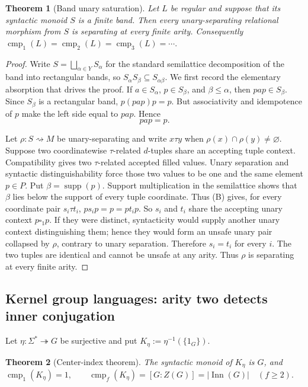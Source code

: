 \documentclass[10pt,a4paper]{article}
\newtheorem{theorem}{Theorem}[section]
\theoremstyle{definition}
\theoremstyle{remark}
\newcommand{\cmp}{\operatorname{cmp}}
\newcommand{\blank}{\square}
\newcommand{\relto}{\mathrel{\rightsquigarrow}}
\begin{document}
\begin{theorem}[Band unary saturation]
\label{band:thm:unary-saturation}
Let \(L\) be regular and suppose that its syntactic monoid \(S\) is a finite
band.  Then every unary-separating relational morphism from \(S\) is
separating at every finite arity.  Consequently
\(\cmp_1(L)=\cmp_2(L)=\cmp_3(L)=\cdots.\)
\end{theorem}

\begin{proof}
Write
\(S=\bigsqcup_{\alpha\in Y}S_\alpha\)
for the standard semilattice decomposition of the band into rectangular
bands, so
\(S_\alpha S_\beta\subseteq S_{\alpha\beta}\).
We first record the elementary absorption that drives the proof.  If
\(a\in S_\alpha\), \(p\in S_\beta\), and \(\beta\le\alpha\), then
\(pap\in S_\beta\).  Since \(S_\beta\) is a rectangular band,
\(p(pap)p=p.\)
But associativity and idempotence of \(p\) make the left side equal to
\(pap\).  Hence
\[
 pap=p.
\tag{B}
\]

Let \(\rho:S\relto M\) be unary-separating and write
\(x\tau y\) when \(\rho(x)\cap\rho(y)\ne\varnothing\).  Suppose two
coordinatewise \(\tau\)-related \(d\)-tuples share an accepting tuple context.
Compatibility gives two \(\tau\)-related accepted filled values.  Unary
separation and syntactic distinguishability force those two values to be one
and the same element \(p\in P\).  Put
\(\beta=\operatorname{supp}(p)\).  Support multiplication in the semilattice
shows that \(\beta\) lies below the support of every tuple coordinate.  Thus
\textup{(B)} gives, for every coordinate pair \(s_i\tau t_i\),
\(p s_i p=p=p t_i p.\)
So \(s_i\) and \(t_i\) share the accepting unary context
\(p\blank_1p\).  If they were distinct, syntacticity would supply another
unary context distinguishing them; hence they would form an unsafe unary pair
collapsed by \(\rho\), contrary to unary separation.  Therefore
\(s_i=t_i\) for every \(i\).  The two tuples are identical and cannot be
unsafe at any arity.  Thus \(\rho\) is separating at every finite arity.
\end{proof}



\subsection{Kernel group languages: arity two detects inner conjugation}

Let \(\eta:\Sigma^*\twoheadrightarrow G\) be surjective and put \(K_\eta:=\eta^{-1}(\{1_G\}).\) \begin{theorem}[Center-index theorem]
\label{group:thm:center-index}
The syntactic monoid of \(K_\eta\) is \(G\), and
\(
\cmp_1(K_\eta)=1,
\qquad
\cmp_f(K_\eta)=[G:Z(G)]=|\operatorname{Inn}(G)|
\quad(f\ge2).
\)
\end{theorem}
\end{document}
